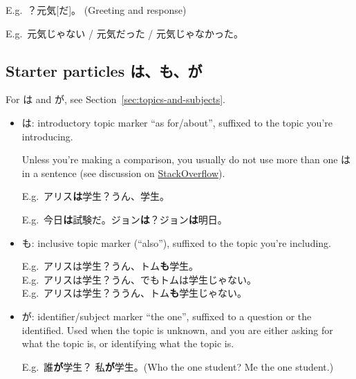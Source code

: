 \documentclass[../nihongo-gakushuu-kyouzai.tex]{subfiles}
\begin{document}
E.g.\ ？元気[だ]。 (Greeting and response)

E.g.\ 元気じゃない / 元気だった / 元気じゃなかった。

\subsection{Starter particles は、も、が} \label{sec:particles}
For は and が, see Section~\ref{sec:topics-and-subjects}.
\begin{itemize}
    \item は: introductory topic marker ``as for/about'', suffixed to the topic you're introducing.

    Unless you're making a comparison, you usually do not use more than one は in a sentence (see discussion on \href{https://japanese.stackexchange.com/q/5375}{StackOverflow}).

    E.g.\ アリス\textbf{は}学生？うん、学生。

    E.g.\ 今日\textbf{は}試験だ。ジョン\textbf{は}？ジョン\textbf{は}明日。
    \item も: inclusive topic marker (``also''), suffixed to the topic you're including.

    E.g.\ アリスは学生？うん、トム\textbf{も}学生。\\
    E.g.\ アリスは学生？うん、でもトムは学生じゃない。\\
    E.g.\ アリスは学生？ううん、トム\textbf{も}学生じゃない。
    \item が: identifier/subject marker ``the one'', suffixed to a question or the identified. Used when the topic is unknown, and you are either asking for what the topic is, or identifying what the topic is.

    E.g.\ 誰\textbf{が}学生？ 私\textbf{が}学生。(Who the one student? Me the one student.)\\
\end{itemize}
\end{document}
